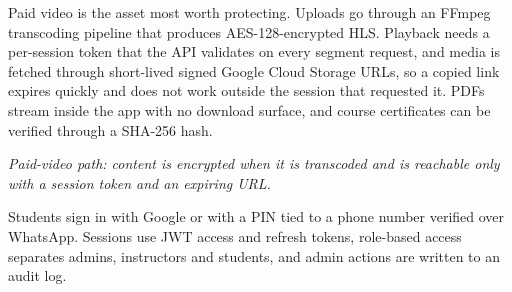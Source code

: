  Paid video is the asset most worth protecting. Uploads go through an
FFmpeg transcoding pipeline that produces AES-128-encrypted HLS. Playback needs a per-session token
that the API validates on every segment request, and media is fetched through short-lived signed
Google Cloud Storage URLs, so a copied link expires quickly and does not work outside the session
that requested it. PDFs stream inside the app with no download surface, and course certificates
can be verified through a SHA-256 hash.

\begin{center}
\vspace{2pt}
\par
\vspace{3pt}
{\footnotesize\itshape\color{muted}Paid-video path: content is encrypted when it is transcoded and is reachable only with a session token and an expiring URL.}
\end{center}

 Students sign in with Google or with a PIN tied to a phone number
verified over WhatsApp. Sessions use JWT access and refresh tokens, role-based access separates
admins, instructors and students, and admin actions are written to an audit log.

